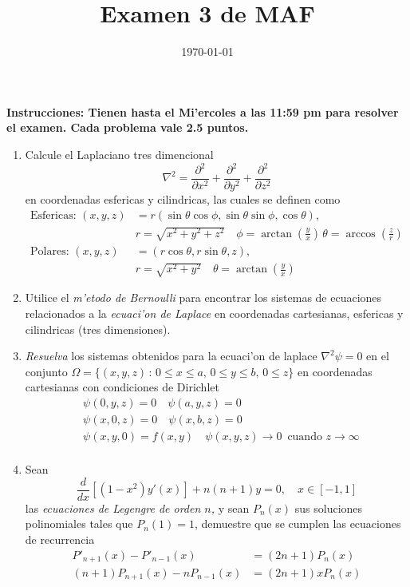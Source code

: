 \documentclass[letterpaper]{article}
\date{\today}
\title{Examen 3 de MAF}
\begin{document}
\maketitle
\noindent\textbf{Instrucciones: Tienen hasta el Mi'ercoles a las 11:59 pm para resolver el examen. Cada problema vale 2.5 puntos.}

\begin{enumerate}

  \item Calcule el Laplaciano tres dimencional
        \[
        \nabla^{2}=\dfrac{\partial^{2}}{\partial x^{2}}+\dfrac{\partial^{2}}{\partial y^{2}}+\dfrac{\partial^{2}}{\partial z^{2}}
        \]
        en coordenadas esfericas y cilindricas, las cuales se definen como
        \begin{align*}
          \text{Esfericas: }(x,y,z)&=r(\sin\theta\cos\phi,\sin\theta\sin\phi,\cos\theta),\\ &r=\sqrt{x^{2}+y^{2}+z^{2}}\quad\phi=\arctan\left(\frac{y}{x}\right)\,\theta=\arccos\left(\frac{z}{r}\right)\\
          \text{Polares: }(x,y,z)&=(r\cos\theta,r\sin\theta,z),\\
          &r=\sqrt{x^{2}+y^{2}}\quad\theta=\arctan\left(\frac{y}{x}\right)
        \end{align*}
  \item Utilice el \emph{m'etodo de Bernoulli} para encontrar los sistemas de ecuaciones relacionados a la \emph{ecuaci'on de Laplace} en coordenadas cartesianas, esfericas y cilindricas (tres dimensiones).
  \item \emph{Resuelva} los sistemas obtenidos para la ecuaci'on de laplace $\nabla^{2}\psi=0$ en el conjunto $\Omega=\{(x,y,z)\,:\,0\leq x\leq a,\,0\leq y\leq b, \,0\leq z\}$ en coordenadas cartesianas con condiciones de Dirichlet
        \begin{align*}
          &\psi(0,y,z)=0\quad\psi(a,y,z)=0\\
          &\psi(x,0,z)=0\quad\psi(x,b,z)=0\\
          &\psi(x,y,0)=f(x,y)\quad\psi(x,y,z)\to0\,\text{ cuando }z\to\infty\\
          \end{align*}
  \item Sean
\begin{equation}
  \dfrac{d}{dx}\left[(1-x^{2})y'(x)\right]+n(n+1)y=0,\quad x\in [-1,1]
\end{equation}
        las \emph{ecuaciones de Legengre de orden \(n\),} y sean $P_{n}(x)$ sus soluciones polinomiales tales que $P_{n}(1)=1$, demuestre que se cumplen las ecuaciones de recurrencia
        \begin{align*}
          P'_{n+1}(x)-P'_{n-1}(x)&=(2n+1)P_{n}(x)\\
          (n+1)P_{n+1}(x)-nP_{n-1}(x)&=(2n+1)xP_{n}(x)\\
        \end{align*}
\end{enumerate}
\end{document}
